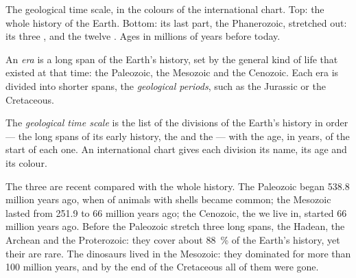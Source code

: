 \begin{omfigure}
{\small The geological time scale, in the colours of the international
chart. Top: the whole history of the Earth. Bottom: its last part, the
Phanerozoic, stretched out: its three , and the twelve . Ages in millions of years before today.}
\label{fig:g7:geological-time:scale}
\end{omfigure}

\begin{definition}\label{def:g7:geological-time:era-period}
An \emph{era} is a long span of the Earth's history, set by
the general kind of life that existed at that time: the Paleozoic, the
Mesozoic and the Cenozoic. Each era is divided into shorter spans, the
\emph{geological periods}, such as the Jurassic
or the Cretaceous.
\end{definition}

\begin{definition}\label{def:g7:geological-time:time-scale}
The \emph{geological time scale} is the list
of the divisions of the Earth's history in order --- the long spans of
its early history, the  and the  --- with the age,
in years, of the start of each one. An international chart gives each
division its name, its age and its colour.
\end{definition}


The three  are recent compared with the whole history. The
Paleozoic began \num{538.8} million years ago, when  of animals
with shells became common; the Mesozoic lasted from \num{251.9} to
\num{66} million years ago; the Cenozoic, the  we live in, started
\num{66} million years ago. Before the Paleozoic stretch three long spans,
the Hadean, the Archean and the Proterozoic: they cover about
88~\% of the Earth's history, yet their  are rare. The dinosaurs lived in the Mesozoic: they dominated
for more than \num{100} million years, and by the end of the Cretaceous
all of them were gone.

